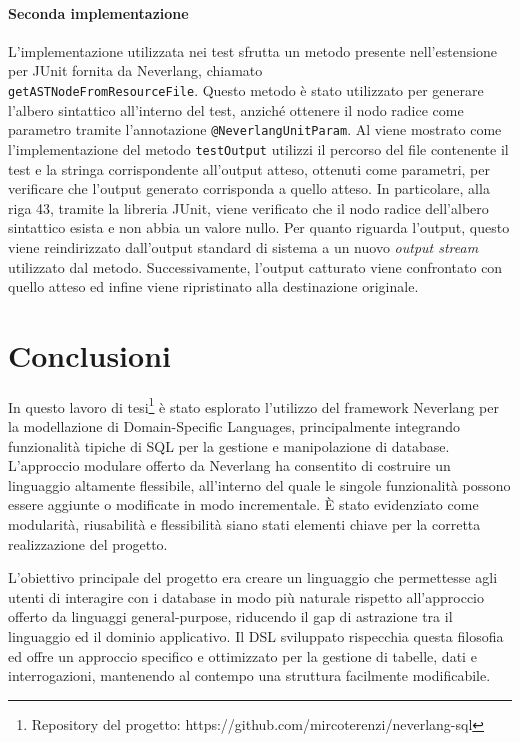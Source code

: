 \documentclass[12pt,a4paper,openright,twoside]{book}
\begin{document}
\paragraph{Seconda implementazione}
L’implementazione utilizzata nei test sfrutta un metodo presente nell'estensione per JUnit fornita da Neverlang, chiamato\\
\texttt{getASTNodeFromResourceFile}. Questo metodo è stato utilizzato per generare l’albero sintattico all’interno del test, anziché 
ottenere il nodo radice come parametro tramite l’annotazione \texttt{@NeverlangUnitParam}. Al  viene mostrato 
come l’implementazione del metodo \texttt{testOutput} utilizzi il percorso del file contenente il test e la stringa corrispondente 
all’output atteso, ottenuti come parametri, per verificare che l’output generato corrisponda a quello atteso. In particolare, alla 
riga 43, tramite la libreria JUnit, viene verificato che il nodo radice dell’albero sintattico esista e non abbia un valore nullo. 
Per quanto riguarda l’output, questo viene reindirizzato dall’output standard di sistema a un nuovo \textit{output stream} utilizzato 
dal metodo. Successivamente, l’output catturato viene confrontato con quello atteso ed infine viene ripristinato alla 
destinazione originale.



\newpage
\section{Conclusioni}
In questo lavoro di tesi\footnote{Repository del progetto: https://github.com/mircoterenzi/neverlang-sql} è stato esplorato 
l’utilizzo del framework Neverlang per la modellazione di Domain-Specific Languages, 
principalmente integrando funzionalità tipiche di SQL per la gestione e manipolazione di database. L’approccio modulare offerto 
da Neverlang ha consentito di costruire un linguaggio altamente flessibile, all’interno del quale le singole funzionalità possono 
essere aggiunte o modificate in modo incrementale. È stato evidenziato come modularità, riusabilità e flessibilità siano stati 
elementi chiave per la corretta realizzazione del progetto.

L’obiettivo principale del progetto era creare un linguaggio che permettesse agli utenti di interagire con i database in modo più 
naturale rispetto all’approccio offerto da linguaggi general-purpose, riducendo il gap di astrazione tra il linguaggio ed il 
dominio applicativo. Il DSL sviluppato rispecchia questa filosofia ed offre un approccio specifico e ottimizzato per la gestione 
di tabelle, dati e interrogazioni, mantenendo al contempo una struttura facilmente modificabile.
\end{document}
